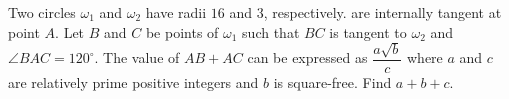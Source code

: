 Two circles $\omega_1$ and $\omega_2$ have radii $16$ and $3$, respectively. are internally tangent at point $A$. Let $B$ and $C$ be points of $\omega_1$ such that $BC$ is tangent to $\omega_2$ and $\angle BAC=120^{\circ}$. The value of $AB+AC$ can be expressed as $\dfrac{a\sqrt{b}}{c}$ where $a$ and $c$ are relatively prime positive integers and $b$ is square-free. Find $a+b+c$.

